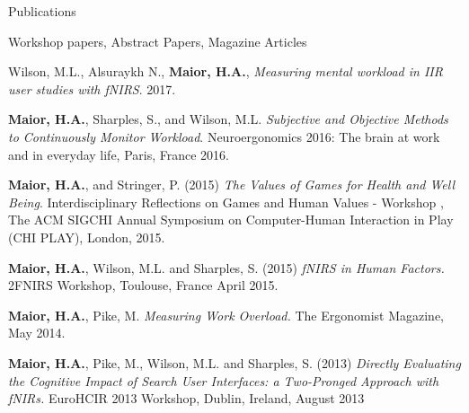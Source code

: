 \documentclass{resume} %
\begin{document}
\begin{rSection}{Publications}
\begin{rSubsection}{ }{ }{ }{Workshop papers, Abstract Papers, Magazine Articles}
	
	\item Wilson, M.L., Alsuraykh N., \textbf{Maior, H.A.},  \emph{Measuring mental workload in IIR user studies with fNIRS}. 2017.
	\item \textbf{Maior, H.A.}, Sharples, S., and Wilson, M.L. \emph{Subjective and Objective Methods to Continuously Monitor Workload}. Neuroergonomics 2016: The brain at work and in everyday life, Paris, France 2016.
    \item \textbf{Maior, H.A.}, and Stringer, P. (2015) \emph{The Values of Games for Health and Well Being}. Interdisciplinary Reflections on Games and Human Values - Workshop , The ACM SIGCHI Annual Symposium on Computer-Human Interaction in Play (CHI PLAY), London, 2015.
    \item \textbf{Maior, H.A.}, Wilson, M.L. and Sharples, S. (2015) \emph{fNIRS in Human Factors.} 2FNIRS Workshop, Toulouse, France April 2015.
    \item \textbf{Maior, H.A.}, Pike, M. \emph{Measuring Work Overload.} The Ergonomist Magazine, May 2014.
    \item \textbf{Maior, H.A.}, Pike, M., Wilson, M.L. and Sharples, S. (2013) \emph{Directly Evaluating the Cognitive Impact of Search User Interfaces: a Two-Pronged Approach with fNIRs.} EuroHCIR 2013 Workshop, Dublin, Ireland, August 2013
\end{rSubsection}

\end{rSection}
\vspace{-2 mm}

\end{document}
